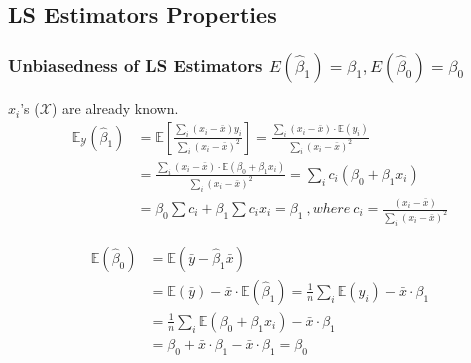 \documentclass[11pt,a4paper]{article}
\begin{document}
\subsection{LS Estimators Properties}
\subsubsection{Unbiasedness of LS Estimators $E(\hat{\beta}_1)=\beta_1, E(\hat{\beta}_0)=\beta_0$}
$x_i$'s ($\mathcal{X}$) are already known.
\begin{equation}
    \begin{aligned}
        \mathbb{E}_{\mathcal{Y}}\left(\hat{\beta}_{1}\right) &=\mathbb{E}\left[\frac{\sum_{i}\left(x_{i}-\bar{x}\right) y_{i}}{\sum_{i}\left(x_{i}-\bar{x}\right)^{2}}\right]=\frac{\sum_{i}\left(x_{i}-\bar{x}\right) \cdot \mathbb{E}\left(y_{i}\right)}{\sum_{i}\left(x_{i}-\bar{x}\right)^{2}} \\
        &=\frac{\sum_{i}\left(x_{i}-\bar{x}\right) \cdot \mathbb{E}\left(\beta_{0}+\beta_{1} x_{i}\right)}{\sum_{i}\left(x_{i}-\bar{x}\right)^{2}}=\sum_{i} c_{i}\left(\beta_{0}+\beta_{1} x_{i}\right) \\
        &=\beta_{0} \sum c_{i}+\beta_{1} \sum c_{i} x_{i}=\beta_{1}\ ,where\ c_i=\frac{\left(x_{i}-\bar{x}\right)}{\sum_{i}\left(x_{i}-\bar{x}\right)^2}
        \end{aligned}
    \nonumber
\end{equation}

\begin{equation}
    \begin{aligned}
        \mathbb{E}\left(\hat{\beta}_{0}\right) &=\mathbb{E}\left(\bar{y}-\hat{\beta}_{1} \bar{x}\right) \\
        &=\mathbb{E}(\bar{y})-\bar{x} \cdot \mathbb{E}\left(\hat{\beta}_{1}\right)=\frac{1}{n} \sum_{i} \mathbb{E}\left(y_{i}\right)-\bar{x} \cdot \beta_{1} \\
        &=\frac{1}{n} \sum_{i} \mathbb{E}\left(\beta_{0}+\beta_{1} x_{i}\right)-\bar{x} \cdot \beta_{1} \\
        &=\beta_{0}+\bar{x} \cdot \beta_{1}-\bar{x} \cdot \beta_{1}=\beta_{0}
        \end{aligned}
    \nonumber
\end{equation}
\end{document}
